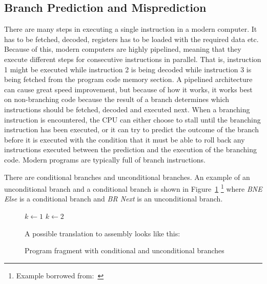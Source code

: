 \subsection{Branch Prediction and Misprediction}
There are many steps in executing a single instruction in a modern computer.
It has to be fetched, decoded, registers has to be loaded with the required data etc.
Because of this, modern computers are highly pipelined, meaning that they execute different steps for consecutive instructions in parallel.
That is, instruction 1 might be executed while instruction 2 is being decoded while instruction 3 is being fetched from the program code memory section.
A pipelined architecture can cause great speed improvement, but because of how it works, it works best on non-branching code because the result of a branch determines which instructions should be fetched, decoded and executed next.
When a branching instruction is encountered, the CPU can either choose to stall until the branching instruction has been executed, or it can try to predict the outcome of the branch before it is executed with the condition that it must be able to roll back any instructions executed between the prediction and the execution of the branching code.
Modern programs are typically full of branch instructions.

There are conditional branches and unconditional branches. 
An example of an unconditional branch and a conditional branch is shown in Figure~\ref{fig:branchexample} \footnote{Example borrowed from:~} where \textit{BNE Else} is a conditional branch and \textit{BR Next} is an unconditional branch.

\begin{figure}
\begin{framed}
\begin{algorithmic}
	\State $k \gets 1$
\Else
	\State $k \gets 2$
\EndIf
\end{algorithmic}
\vspace{0.3cm}
\noindent
A possible translation to assembly looks like this:
\vspace{0.3cm}
\begin{compactenum}
\item \itab{ }  
\item \itab{ }  
\item {}  
\item \itab{ }  
\item {}  
\item {}
\end{compactenum}
\end{framed}
\caption{Program fragment with conditional and unconditional branches}
\label{fig:branchexample}

\end{figure}

